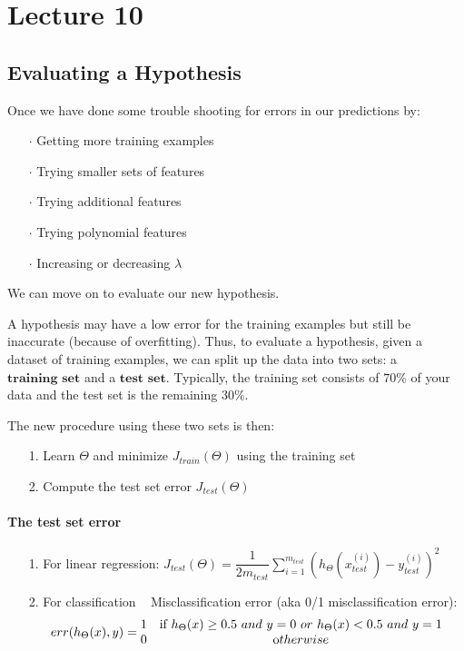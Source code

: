 \documentclass[UTF8]{article}
\begin{document}
\newpage

\section{Lecture 10}

\subsection{Evaluating a Hypothesis}

Once we have done some trouble shooting for errors in our predictions by:

\begin{itemize}
\item[$\cdot$]Getting more training examples
\item[$\cdot$]Trying smaller sets of features
\item[$\cdot$]Trying additional features
\item[$\cdot$]Trying polynomial features
\item[$\cdot$]Increasing or decreasing $\lambda$
\end{itemize}

We can move on to evaluate our new hypothesis.

A hypothesis may have a low error for the training examples but still be inaccurate (because of overfitting). Thus, to evaluate a hypothesis, given a dataset of training examples, we can split up the data into two sets: a $\textbf{training set}$ and a $\textbf{test set}$. Typically, the training set consists of $70\%$ of your data and the test set is the remaining $30\%$.

The new procedure using these two sets is then:

\begin{itemize}
\item[{1.}]Learn $\Theta$ and minimize $J_{train}(\Theta)$ using the training set
\item[{2.}]Compute the test set error $J_{test}(\Theta)$
\end{itemize}

\paragraph{The test set error}

\begin{itemize}
\item[{1.}]For linear regression: $J_{test}(\Theta) = \dfrac{1}{2m_{test}} \sum_{i=1}^{m_{test}}(h_\Theta(x^{(i)}_{test}) - y^{(i)}_{test})^2$
\item[{2.}]For classification ~ Misclassification error (aka 0/1 misclassification error):
\[err(h_\Theta(x),y) = \begin{matrix} 1 & \mbox{if } h_\Theta(x) \geq 0.5\ and\ y = 0\ or\ h_\Theta(x) < 0.5\ and\ y = 1\\ 0 & \mbox otherwise \end{matrix}\]
\end{itemize}
\end{document}

